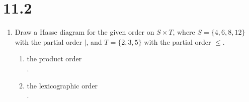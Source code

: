 \documentclass[11pt]{article}
\begin{document}
\section*{11.2}
\begin{enumerate}
\item Draw a Hasse diagram for the given order on $S\times T$, where $S=\{4,6,8,12\}$ with the partial order $\mid$, and $T=\{2,3,5\}$ with the partial order $\leq$. 
	\begin{enumerate}
	\item the product order\\
	.
	\item the lexicographic order\\
	.
	\end{enumerate}
\end{enumerate}
\end{document}
